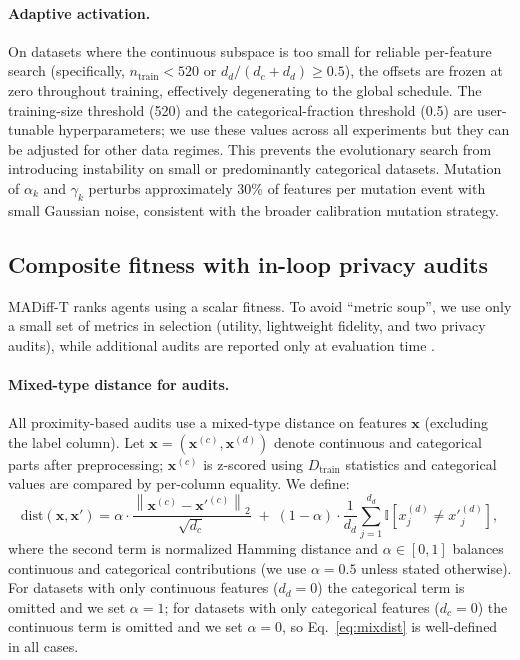 \documentclass[preprint,12pt]{elsarticle}
\begin{document}
\paragraph{Adaptive activation.}
On datasets where the continuous subspace is too small for reliable per-feature search (specifically, $n_{\text{train}} < 520$ or $d_d/(d_c + d_d) \geq 0.5$), the offsets are frozen at zero throughout training, effectively degenerating to the global schedule. The training-size threshold (520) and the categorical-fraction threshold (0.5) are user-tunable hyperparameters; we use these values across all experiments but they can be adjusted for other data regimes. This prevents the evolutionary search from introducing instability on small or predominantly categorical datasets. Mutation of $\alpha_k$ and $\gamma_k$ perturbs approximately 30\% of features per mutation event with small Gaussian noise, consistent with the broader calibration mutation strategy.
\subsection{Composite fitness with in-loop privacy audits}
\label{sec:method_fitness}

MADiff-T ranks agents using a scalar fitness. To avoid ``metric soup'', we use only a small set of metrics in selection (utility, lightweight fidelity, and two privacy audits), while additional audits are reported only at evaluation time \cite{Hernandez2025,Hyrup2025}.

\paragraph{Mixed-type distance for audits.}
All proximity-based audits use a mixed-type distance on features $\mathbf{x}$ (excluding the label column). Let $\mathbf{x}=(\mathbf{x}^{(c)},\mathbf{x}^{(d)})$ denote continuous and categorical parts after preprocessing; $\mathbf{x}^{(c)}$ is z-scored using $D_{\text{train}}$ statistics and categorical values are compared by per-column equality. We define:
\begin{equation}
\mathrm{dist}(\mathbf{x},\mathbf{x}')=\alpha \cdot \frac{\left\|\mathbf{x}^{(c)}-\mathbf{x}'^{(c)}\right\|_2}{\sqrt{d_c}}
\;+\;
(1-\alpha)\cdot \frac{1}{d_d}\sum_{j=1}^{d_d}\mathbb{I}\!\left[x^{(d)}_j\neq x'^{(d)}_j\right],
\label{eq:mixdist}
\end{equation}
where the second term is normalized Hamming distance and $\alpha\in[0,1]$ balances continuous and categorical contributions (we use $\alpha=0.5$ unless stated otherwise). For datasets with only continuous features ($d_d=0$) the categorical term is omitted and we set $\alpha=1$; for datasets with only categorical features ($d_c=0$) the continuous term is omitted and we set $\alpha=0$, so Eq.~\eqref{eq:mixdist} is well-defined in all cases.
\end{document}
